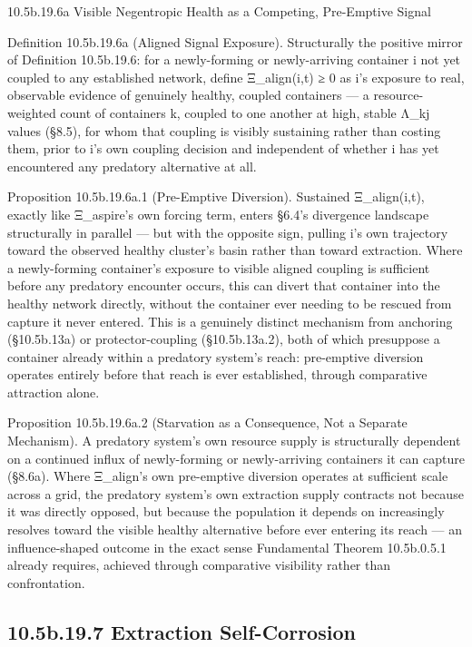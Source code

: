 \documentclass[
]{article}
\begin{document}
10.5b.19.6a Visible Negentropic Health as a Competing, Pre-Emptive
Signal

Definition 10.5b.19.6a (Aligned Signal Exposure). Structurally the
positive mirror of Definition 10.5b.19.6: for a newly-forming or
newly-arriving container i not yet coupled to any established network,
define Ξ\_align(i,t) ≥ 0 as i's exposure to real, observable evidence of
genuinely healthy, coupled containers --- a resource-weighted count of
containers k, coupled to one another at high, stable Λ\_kj values
(§8.5), for whom that coupling is visibly sustaining rather than costing
them, prior to i's own coupling decision and independent of whether i
has yet encountered any predatory alternative at all.

Proposition 10.5b.19.6a.1 (Pre-Emptive Diversion). Sustained
Ξ\_align(i,t), exactly like Ξ\_aspire's own forcing term, enters §6.4's
divergence landscape structurally in parallel --- but with the opposite
sign, pulling i's own trajectory toward the observed healthy cluster's
basin rather than toward extraction. Where a newly-forming container's
exposure to visible aligned coupling is sufficient before any predatory
encounter occurs, this can divert that container into the healthy
network directly, without the container ever needing to be rescued from
capture it never entered. This is a genuinely distinct mechanism from
anchoring (§10.5b.13a) or protector-coupling (§10.5b.13a.2), both of
which presuppose a container already within a predatory system's reach:
pre-emptive diversion operates entirely before that reach is ever
established, through comparative attraction alone.

Proposition 10.5b.19.6a.2 (Starvation as a Consequence, Not a Separate
Mechanism). A predatory system's own resource supply is structurally
dependent on a continued influx of newly-forming or newly-arriving
containers it can capture (§8.6a). Where Ξ\_align's own pre-emptive
diversion operates at sufficient scale across a grid, the predatory
system's own extraction supply contracts not because it was directly
opposed, but because the population it depends on increasingly resolves
toward the visible healthy alternative before ever entering its reach
--- an influence-shaped outcome in the exact sense Fundamental Theorem
10.5b.0.5.1 already requires, achieved through comparative visibility
rather than confrontation.

\hypertarget{b.19.7-extraction-self-corrosion}{%
\subsection{10.5b.19.7 Extraction
Self-Corrosion}\label{b.19.7-extraction-self-corrosion}}
\end{document}
